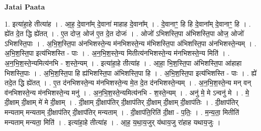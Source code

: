 \documentclass[17pt]{extarticle}
\begin{document}
\textbf{Jatai Paata} \newline

1. इत्या॑हा॒हे तीत्या॑ह । . आ॒ह॒ दे॒वाना᳚म् दे॒वाना॑ माहाह दे॒वाना᳚म् । . दे॒वानाꣳ॒॒ हि हि दे॒वाना᳚म् दे॒वानाꣳ॒॒ हि । . ह्ये॑त दे॒त द्धि ह्ये॑तत् । . ए॒त दोज॒ ओज॑ ए॒त दे॒त दोजः॑ । . ओजो॑ ऽभिशस्ति॒पा अ॑भिशस्ति॒पा ओज॒ ओजो॑ ऽभिशस्ति॒पाः । . अ॒भि॒श॒स्ति॒पा अ॑नभिशस्ते॒न्य म॑नभिशस्ते॒न्य म॑भिशस्ति॒पा अ॑भिशस्ति॒पा अ॑नभिशस्ते॒न्यम् । . अ॒भि॒श॒स्ति॒पा इत्य॑भिशस्ति - पाः । . अ॒न॒भि॒श॒स्ते॒न्य मितीत्य॑नभिशस्ते॒न्य म॑नभिशस्ते॒न्य मिति॑ । . अ॒न॒भि॒श॒स्ते॒न्यमित्य॑नभि - श॒स्ते॒न्यम् । . इत्या॑हा॒हे तीत्या॑ह । . आ॒हा॒ भि॒श॒स्ति॒पा अ॑भिशस्ति॒पा आ॑हाहा भिशस्ति॒पाः । . अ॒भि॒श॒स्ति॒पा हि ह्य॑भिशस्ति॒पा अ॑भिशस्ति॒पा हि । . अ॒भि॒श॒स्ति॒पा इत्य॑भिशस्ति - पाः । . ह्ये॑ तदे॒त द्धि ह्ये॑तत् । . ए॒त द॑नभिशस्ते॒न्य म॑नभिशस्ते॒न्य मे॒त दे॒त द॑नभिशस्ते॒न्यम् । . अ॒न॒भि॒श॒स्ते॒न्य मन् वन् व॑नभिशस्ते॒न्य म॑नभिशस्ते॒न्य मनु॑ । . अ॒न॒भि॒श॒स्ते॒न्यमित्य॑नभि - श॒स्ते॒न्यम् । . अनु॑ मे॒ मे ऽन्वनु॑ मे । . मे॒ दी॒क्षाम् दी॒क्षाम् मे॑ मे दी॒क्षाम् । . दी॒क्षाम् दी॒क्षाप॑तिर् दी॒क्षाप॑तिर् दी॒क्षाम् दी॒क्षाम् दी॒क्षाप॑तिः । . दी॒क्षाप॑तिर् मन्यताम् मन्यताम् दी॒क्षाप॑तिर् दी॒क्षाप॑तिर् मन्यताम् । . दी॒क्षाप॑ति॒रिति॑ दी॒क्षा - प॒तिः॒ । . म॒न्य॒ता॒ मितीति॑ मन्यताम् मन्यता॒ मिति॑ । . इत्या॑हा॒हे तीत्या॑ह । . आ॒ह॒ य॒था॒य॒जुर् य॑थाय॒जु रा॑हाह यथाय॒जुः । \newline
\end{document}
